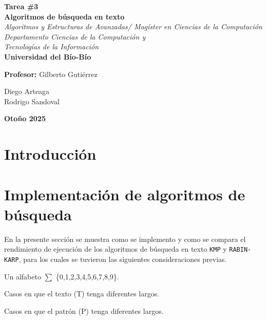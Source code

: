 \documentclass[12pt]{article}
\begin{document}
	
	\begin{titlepage}
		\centering
		\vspace*{2cm}
		
		{\LARGE\textbf{Tarea \#3 \\
		Algoritmos de búsqueda en texto}}\\[0.3cm]
		
		\textit{Algoritmos y Estructuras de Avanzadas/ Magíster en Ciencias de la Computación}\\
		\textit{Departamento Ciencias de la Computación y}\\
		\textit{Tecnologías de la Información}\\[0.5cm]
		
		{\large\textbf{Universidad del Bío-Bío}}\\[2cm]
		
		\begin{flushleft}
			\textbf{Profesor:} Gilberto Gutiérrez
		\end{flushleft}
		
		\begin{flushright}
			Diego Arteaga \\
			Rodrigo Sandoval
		\end{flushright}
		
		\vfill
		\textbf{Otoño 2025}
	\end{titlepage}
	
	\section{Introducción}
	
	\section{Implementación de algoritmos de búsqueda}
	En la presente sección se muestra como se implemento y como se compara el rendimiento de ejecución de los algoritmos de búsqueda en texto \texttt{KMP} y \texttt{RABIN-KARP}, para los cuales se tuvieron las siguientes consideraciones previas.
	
	\begin{description}
		\item Un alfabeto $\sum$ \{0,1,2,3,4,5,6,7,8,9\}.
		\item Casos en que el texto (T) tenga diferentes largos.
		\item Casos en que el patrón (P) tenga diferentes largos.
	\end{description}
	
\end{document}
